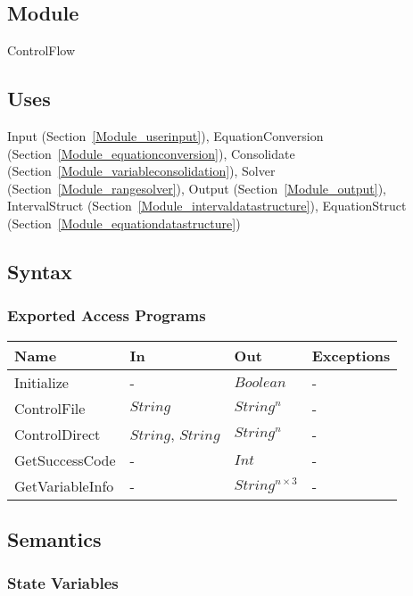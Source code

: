 \documentclass[12pt, titlepage]{article}
\begin{document}
\subsection{Module}

ControlFlow

\subsection{Uses}

Input (Section~\ref{Module_userinput}), EquationConversion 
(Section~\ref{Module_equationconversion}), Consolidate 
(Section~\ref{Module_variableconsolidation}), Solver 
(Section~\ref{Module_rangesolver}), Output (Section~\ref{Module_output}),
IntervalStruct (Section~\ref{Module_intervaldatastructure}), EquationStruct 
(Section~\ref{Module_equationdatastructure})

\subsection{Syntax}

\subsubsection{Exported Access Programs}

\begin{center}
\begin{tabular}{p{3cm} p{3cm} p{3cm} p{5cm}}
\hline
\textbf{Name} & \textbf{In} & \textbf{Out} & \textbf{Exceptions} \\
\hline
Initialize & - & $Boolean$ & - \\
ControlFile & $String$ & $String^n$ & - \\
ControlDirect & $String$, $String$ & $String^n$ & - \\
GetSuccessCode & - & $Int$ & - \\
GetVariableInfo & - & $String^{n \times 3}$ & - \\
\hline
\end{tabular}
\end{center}

\subsection{Semantics}

\subsubsection{State Variables}
\end{document}
